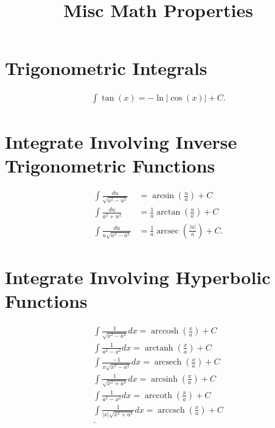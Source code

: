 \documentclass[letter]{article}
\title{Misc Math Properties}
\author{}
\date{}
\DeclareMathOperator{\arcsec}{arcsec}
\DeclareMathOperator{\arccosh}{arccosh}
\DeclareMathOperator{\arctanh}{arctanh}
\DeclareMathOperator{\arcsech}{arcsech}
\DeclareMathOperator{\arcsinh}{arcsinh}
\DeclareMathOperator{\arccoth}{arccoth}
\DeclareMathOperator{\arccsch}{arccsch}
\begin{document}
\maketitle
\tableofcontents

\section{Trigonometric Integrals}
\begin{align*}
  \int\tan(x)= -\ln|\cos(x)|+C
.\end{align*}

\section{Integrate Involving Inverse Trigonometric Functions}
\begin{align*}
  \int \frac{du}{\sqrt{a^2-u^2} }&= \arcsin\left( \frac{u}{a} \right) + C\\
  \int \frac{du}{a^2+u^2}&=\frac{1}{a}\arctan\left( \frac{u}{a} \right) +C\\
  \int \frac{du}{u\sqrt{u^2-a^2} }&=\frac{1}{a} \arcsec \left(\frac{|u|}{a}\right)+C
.\end{align*}

\section{Integrate Involving Hyperbolic Functions}
\begin{align*}
  \int \frac{1}{\sqrt{x^2-a^2} }dx = \arccosh\left( \frac{x}{a} \right) +C\\
  \int \frac{1}{a^2-x^2}dx = \arctanh\left( \frac{x}{a} \right) +C\\
  \int \frac{-1}{x\sqrt{x^2-a^2} }dx= \arcsech\left( \frac{x}{a} \right) +C\\
  \int \frac{1}{\sqrt{x^2+a^2} }dx=\arcsinh\left( \frac{x}{a} \right) +C\\
  \int \frac{1}{a^2-x^2}dx=\arccoth\left( \frac{x}{a} \right) +C\\
  \int \frac{1}{|x|\sqrt{x^2+a^2} }dx=\arccsch\left( \frac{x}{a} \right) +C\\
.\end{align*}
\end{document}
